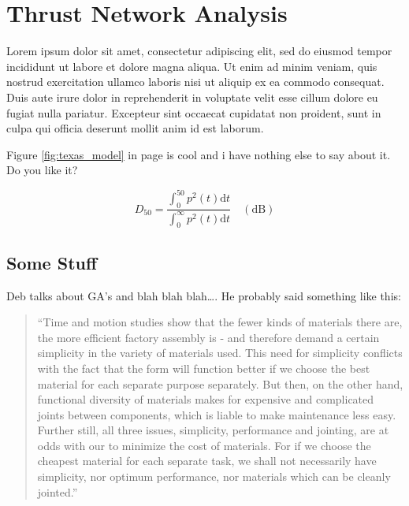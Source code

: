 

\chapter{Thrust Network Analysis}
\label{chap:tna}

Lorem ipsum dolor sit amet, consectetur adipiscing elit, sed do eiusmod tempor
incididunt ut labore et dolore magna aliqua. Ut enim ad minim veniam, quis nostrud exercitation ullamco laboris nisi ut aliquip ex ea commodo consequat. Duis aute irure dolor in reprehenderit in voluptate velit esse cillum dolore eu fugiat nulla pariatur. Excepteur sint occaecat cupidatat non proident, sunt in culpa qui officia deserunt mollit anim id est laborum.

Figure \ref{fig:texas_model} in page \pageref{fig:texas_model} is cool and i
have nothing else to say about it. Do you like it?


\begin{equation}
D_{50} =   \frac{\displaystyle{\int^{50}_{0}p^{2}(t)
\mathrm{d}t}}{\displaystyle{\int^{\infty}_{0}p^{2}(t) \mathrm{d}t}}   \quad \mathrm{(dB)}
\end{equation}



\section{Some Stuff}
\label{sec:some_stuff}

Deb \cite{Deb2001} talks about GA's and blah blah blah\ldots. He probably said
something like this:

\begin{quotation}
``Time and motion studies show that the fewer kinds of materials there are, the more efficient factory assembly is - and therefore demand a certain simplicity in the variety of materials used. This need for simplicity conflicts with the fact that the form will function better if we choose the best material for each separate purpose separately. But then, on the other hand, functional diversity of materials makes for expensive and complicated joints between components, which is liable to make maintenance less easy. Further still, all three issues, simplicity, performance and jointing, are at odds with our  to minimize the cost of materials\cite{tms2013c}. For if we choose the cheapest material for each separate task, we shall not necessarily have simplicity, nor optimum performance, nor materials which can be cleanly jointed.''
\end{quotation}


